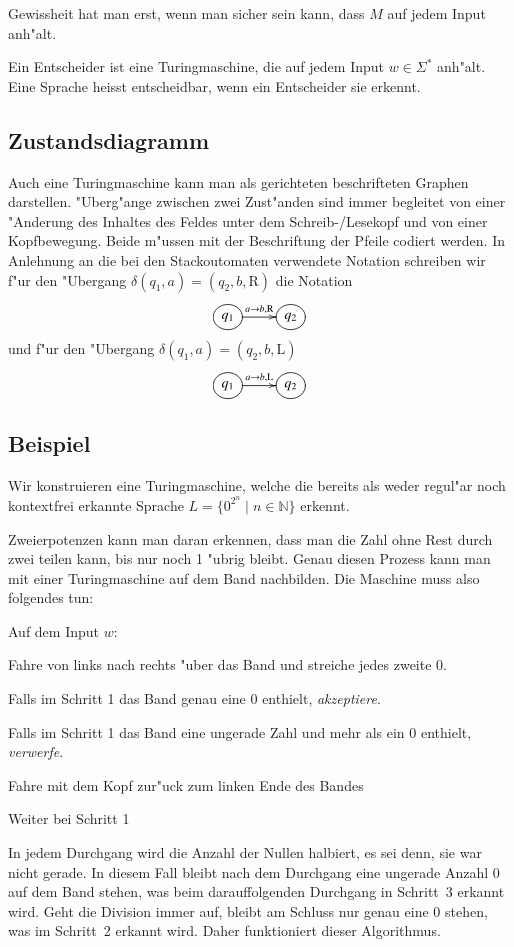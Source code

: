 Gewissheit hat man erst, wenn man sicher sein kann, dass $M$ auf
jedem Input anh"alt.

\begin{definition}
Ein Entscheider ist eine Turingmaschine, die auf jedem Input $w\in\Sigma^*$
anh"alt. Eine Sprache heisst entscheidbar, wenn ein Entscheider sie
erkennt.
\end{definition}

\subsection{Zustandsdiagramm}
Auch eine Turingmaschine kann man als gerichteten beschrifteten Graphen
darstellen. "Uberg"ange zwischen zwei Zust"anden sind immer begleitet von
einer "Anderung des Inhaltes des Feldes unter dem Schreib-/Lesekopf
und von einer Kopfbewegung. Beide m"ussen mit der Beschriftung
der Pfeile codiert werden. In Anlehnung an die bei den Stackoutomaten
verwendete Notation schreiben wir f"ur den "Ubergang
$\delta(q_1,a)=(q_2,b,\text{R})$
die Notation
\[
\entrymodifiers={++[o][F]}
\xymatrix{
{q_1}\ar[r]^{a\to b,\text{R}}
	&{q_2}
}
\]
und f"ur den "Ubergang
$\delta(q_1,a)=(q_2,b,\text{L})$
\[
\entrymodifiers={++[o][F]}
\xymatrix{
{q_1}\ar[r]^{a\to b,\text{L}}
	&{q_2}
}
\]

\subsection{Beispiel}
Wir konstruieren eine Turingmaschine, welche die bereits als weder regul"ar
noch kontextfrei erkannte Sprache $L=\{0^{2^n}\;|\; n\in\mathbb N\}$
erkennt.

Zweierpotenzen kann man daran erkennen, dass man die Zahl ohne
Rest durch zwei teilen kann, bis nur noch 1 "ubrig bleibt. Genau
diesen Prozess kann man mit einer Turingmaschine auf dem Band
nachbilden. Die Maschine muss also folgendes tun:

Auf dem Input $w$:
\begin{compactenum}
\item Fahre von links nach rechts "uber das Band und streiche jedes zweite $0$.
\item Falls im Schritt 1 das Band genau eine $0$ enthielt, {\it akzeptiere}.
\item Falls im Schritt 1 das Band eine ungerade Zahl und mehr als ein $0$
enthielt, {\it verwerfe}.
\item Fahre mit dem Kopf zur"uck zum linken Ende des Bandes
\item Weiter bei Schritt 1
\end{compactenum}
In jedem Durchgang wird die Anzahl der Nullen halbiert, es sei denn,
sie war nicht gerade. In diesem Fall bleibt nach dem Durchgang eine
ungerade Anzahl $0$ auf dem Band stehen, was beim darauffolgenden Durchgang
in Schritt~3 erkannt wird. Geht die Division immer auf, bleibt am Schluss
nur genau eine $0$ stehen, was im Schritt~2 erkannt wird. Daher funktioniert
dieser Algorithmus.


